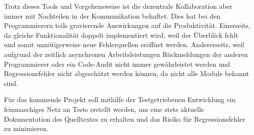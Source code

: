 Trotz dieses Tools und Vorgehensweise ist die dezentrale Kollaboration aber immer mit Nachteilen in der Kommunikation behaftet. Dies hat bei den Programmierern teils gravierende Auswirkungen auf die Produktivität. Einerseits, da gleiche Funktionalität doppelt implementiert wird, weil der Überblick fehlt und somit unnötigerweise neue Fehlerquellen eröffnet werden. Andererseits, weil aufgrund der zeitlich asynchronen Arbeitsleistungen Rückmeldungen der anderen Programmierer oder ein Code-Audit nicht immer gewährleistet werden und Regressionsfehler nicht abgeschätzt werden können, da nicht alle Module bekannt sind.

Für das kommende Projekt soll mithilfe der Testgetriebenen Entwicklung ein feinmaschiges Netz an Tests erstellt werden, um eine stets aktuelle Dokumentation des Quelltextes zu erhalten und das Risiko für Regressionsfehler zu minimieren.
